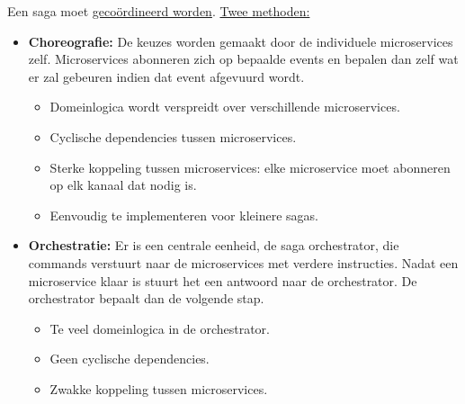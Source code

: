 	Een saga moet \underline{gecoördineerd worden}. \uline{Twee methoden:}
	\begin{itemize}
		\item \textbf{Choreografie:} De keuzes worden gemaakt door de individuele microservices zelf. Microservices abonneren zich op bepaalde events en bepalen dan zelf wat er zal gebeuren indien dat event afgevuurd wordt. 
		\begin{itemize}
			\item[\alert] Domeinlogica wordt verspreidt over verschillende microservices.
			\item[\alert] Cyclische dependencies tussen microservices.
			\item[\alert] Sterke koppeling tussen microservices: elke microservice moet abonneren op elk kanaal dat nodig is.
			\item[\good] Eenvoudig te implementeren voor kleinere sagas. 
		\end{itemize}
		\item \textbf{Orchestratie:} Er is een centrale eenheid, de saga orchestrator, die commands verstuurt naar de microservices met verdere instructies. Nadat een microservice klaar is stuurt het een antwoord naar de orchestrator. De orchestrator bepaalt dan de volgende stap. 
		\begin{itemize}
			\item[\alert] Te veel domeinlogica in de orchestrator.
			\item[\good] Geen cyclische dependencies.
			\item[\good] Zwakke koppeling tussen microservices.
		\end{itemize}
	\end{itemize}

